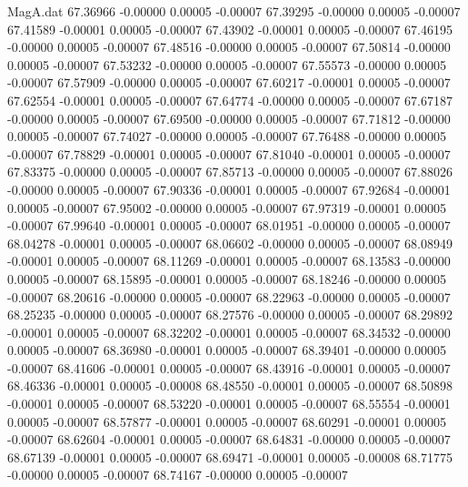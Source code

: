 \begin{filecontents}{MagA.dat}
  67.36966   -0.00000    0.00005   -0.00007
  67.39295   -0.00000    0.00005   -0.00007
  67.41589   -0.00001    0.00005   -0.00007
  67.43902   -0.00001    0.00005   -0.00007
  67.46195   -0.00000    0.00005   -0.00007
  67.48516   -0.00000    0.00005   -0.00007
  67.50814   -0.00000    0.00005   -0.00007
  67.53232   -0.00000    0.00005   -0.00007
  67.55573   -0.00000    0.00005   -0.00007
  67.57909   -0.00000    0.00005   -0.00007
  67.60217   -0.00001    0.00005   -0.00007
  67.62554   -0.00001    0.00005   -0.00007
  67.64774   -0.00000    0.00005   -0.00007
  67.67187   -0.00000    0.00005   -0.00007
  67.69500   -0.00000    0.00005   -0.00007
  67.71812   -0.00000    0.00005   -0.00007
  67.74027   -0.00000    0.00005   -0.00007
  67.76488   -0.00000    0.00005   -0.00007
  67.78829   -0.00001    0.00005   -0.00007
  67.81040   -0.00001    0.00005   -0.00007
  67.83375   -0.00000    0.00005   -0.00007
  67.85713   -0.00000    0.00005   -0.00007
  67.88026   -0.00000    0.00005   -0.00007
  67.90336   -0.00001    0.00005   -0.00007
  67.92684   -0.00001    0.00005   -0.00007
  67.95002   -0.00000    0.00005   -0.00007
  67.97319   -0.00001    0.00005   -0.00007
  67.99640   -0.00001    0.00005   -0.00007
  68.01951   -0.00000    0.00005   -0.00007
  68.04278   -0.00001    0.00005   -0.00007
  68.06602   -0.00000    0.00005   -0.00007
  68.08949   -0.00001    0.00005   -0.00007
  68.11269   -0.00001    0.00005   -0.00007
  68.13583   -0.00000    0.00005   -0.00007
  68.15895   -0.00001    0.00005   -0.00007
  68.18246   -0.00000    0.00005   -0.00007
  68.20616   -0.00000    0.00005   -0.00007
  68.22963   -0.00000    0.00005   -0.00007
  68.25235   -0.00000    0.00005   -0.00007
  68.27576   -0.00000    0.00005   -0.00007
  68.29892   -0.00001    0.00005   -0.00007
  68.32202   -0.00001    0.00005   -0.00007
  68.34532   -0.00000    0.00005   -0.00007
  68.36980   -0.00001    0.00005   -0.00007
  68.39401   -0.00000    0.00005   -0.00007
  68.41606   -0.00001    0.00005   -0.00007
  68.43916   -0.00001    0.00005   -0.00007
  68.46336   -0.00001    0.00005   -0.00008
  68.48550   -0.00001    0.00005   -0.00007
  68.50898   -0.00001    0.00005   -0.00007
  68.53220   -0.00001    0.00005   -0.00007
  68.55554   -0.00001    0.00005   -0.00007
  68.57877   -0.00001    0.00005   -0.00007
  68.60291   -0.00001    0.00005   -0.00007
  68.62604   -0.00001    0.00005   -0.00007
  68.64831   -0.00000    0.00005   -0.00007
  68.67139   -0.00001    0.00005   -0.00007
  68.69471   -0.00001    0.00005   -0.00008
  68.71775   -0.00000    0.00005   -0.00007
  68.74167   -0.00000    0.00005   -0.00007

\end{filecontents}
